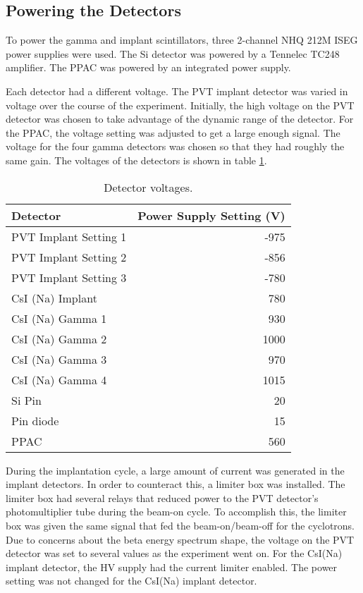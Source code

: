 \documentclass[../MaxHughesThesis.tex]{subfiles}
\begin{document}
\subsection{Powering the Detectors}

To power the gamma and implant scintillators, three 2-channel NHQ 212M ISEG power supplies were used.
The Si detector was powered by a Tennelec TC248 amplifier.
The PPAC was powered by an integrated power supply.

Each detector had a different voltage. 
The PVT implant detector was varied in voltage over the course of the experiment.
Initially, the high voltage on the PVT detector was chosen to take advantage of the dynamic range of the detector.
For the PPAC, the voltage setting was adjusted to get a large enough signal.
The voltage for the four gamma detectors was chosen so that they had roughly the same gain.
The voltages of the detectors is shown in table \ref{tab:detvolt}.
\begin{table}[!hbt]
	\caption{Detector voltages.}
	\centering
		\begin{tabular}{lr}
		Detector & Power Supply Setting (V) \\ \hline
		PVT Implant Setting 1 & -975 \\
		PVT Implant Setting 2 & -856 \\
		PVT Implant Setting 3 & -780 \\
		CsI (Na) Implant & 780 \\ 
		CsI (Na) Gamma 1 & 930 \\
		CsI (Na) Gamma 2 & 1000 \\
		CsI (Na) Gamma 3 & 970 \\
		CsI (Na) Gamma 4 & 1015 \\
		Si Pin & 20 \\
		Pin diode & 15 \\
		PPAC & 560  
		\end{tabular}
	\label{tab:detvolt}
\end{table}

During the implantation cycle, a large amount of current was generated in the implant detectors.
In order to counteract this, a limiter box was installed.
The limiter box had several relays that reduced power to the PVT detector's photomultiplier tube during the beam-on cycle. 
To accomplish this, the limiter box was given the same signal that fed the beam-on/beam-off for the cyclotrons.
Due to concerns about the beta energy spectrum shape, the voltage on the PVT detector was set to several values as the experiment went on. 
For the CsI(Na) implant detector, the HV supply had the current limiter enabled.
The power setting was not changed for the CsI(Na) implant detector. 
\end{document}
